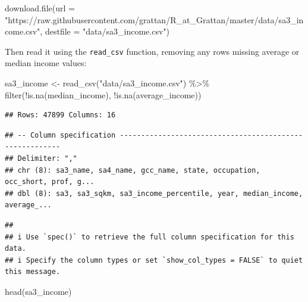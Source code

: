 \documentclass[
]{book}
\newenvironment{Shaded}{\begin{snugshade}}{\end{snugshade}}
\newcommand{\AttributeTok}[1]{\textcolor[rgb]{0.77,0.63,0.00}{#1}}
\newcommand{\FunctionTok}[1]{\textcolor[rgb]{0.00,0.00,0.00}{#1}}
\newcommand{\NormalTok}[1]{#1}
\newcommand{\OtherTok}[1]{\textcolor[rgb]{0.56,0.35,0.01}{#1}}
\newcommand{\SpecialCharTok}[1]{\textcolor[rgb]{0.00,0.00,0.00}{#1}}
\newcommand{\StringTok}[1]{\textcolor[rgb]{0.31,0.60,0.02}{#1}}
\begin{document}
\begin{Shaded}
\begin{Highlighting}[]
\FunctionTok{download.file}\NormalTok{(}\AttributeTok{url =} \StringTok{"https://raw.githubusercontent.com/grattan/R\_at\_Grattan/master/data/sa3\_income.csv"}\NormalTok{,}
              \AttributeTok{destfile =} \StringTok{"data/sa3\_income.csv"}\NormalTok{)}
\end{Highlighting}
\end{Shaded}

Then read it using the \texttt{read\_csv} function, removing any rows missing average or median income values:

\begin{Shaded}
\begin{Highlighting}[]
\NormalTok{sa3\_income }\OtherTok{\textless{}{-}} \FunctionTok{read\_csv}\NormalTok{(}\StringTok{"data/sa3\_income.csv"}\NormalTok{) }\SpecialCharTok{\%\textgreater{}\%} 
  \FunctionTok{filter}\NormalTok{(}\SpecialCharTok{!}\FunctionTok{is.na}\NormalTok{(median\_income),}
         \SpecialCharTok{!}\FunctionTok{is.na}\NormalTok{(average\_income))}
\end{Highlighting}
\end{Shaded}

\begin{verbatim}
## Rows: 47899 Columns: 16
\end{verbatim}

\begin{verbatim}
## -- Column specification --------------------------------------------------------
## Delimiter: ","
## chr (8): sa3_name, sa4_name, gcc_name, state, occupation, occ_short, prof, g...
## dbl (8): sa3, sa3_sqkm, sa3_income_percentile, year, median_income, average_...
\end{verbatim}

\begin{verbatim}
## 
## i Use `spec()` to retrieve the full column specification for this data.
## i Specify the column types or set `show_col_types = FALSE` to quiet this message.
\end{verbatim}

\begin{Shaded}
\begin{Highlighting}[]
\FunctionTok{head}\NormalTok{(sa3\_income)}
\end{Highlighting}
\end{Shaded}
\end{document}
